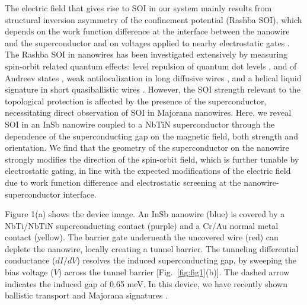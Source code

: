 The electric field that gives rise to SOI in our system mainly results from structural inversion asymmetry of the confinement potential (Rashba SOI), which depends on the work function difference at the interface between the nanowire and the superconductor and on voltages applied to nearby electrostatic gates \cite{Vuik2016,Antipov2018,Woods2018,Mikkelsen2018}.
The Rashba SOI in nanowires has been investigated extensively by measuring spin-orbit related quantum effects: level repulsion of quantum dot levels \cite{Fasth2007,Nadj-Perge2012}, and of Andreev states \cite{Moor2018,Deng2016}, weak antilocalization in long \mbox{diffusive} wires \cite{Hansen2005,Weperen2015}, and a helical liquid signature in short quasiballistic wires \cite{Kammhuber2017}.
However, the SOI strength relevant to the topological protection is affected by the \mbox{presence} of the superconductor, necessitating direct observation of SOI in Majorana nanowires.
Here, we reveal SOI in an InSb nanowire coupled to a NbTiN superconductor through the dependence of the superconducting gap on the magnetic field, both strength and orientation.
We find that the geometry of the superconductor on the nanowire strongly modifies the direction of the spin-orbit field, which is further tunable by electrostatic gating, in line with the expected modifications of the electric field due to work function difference and electrostatic screening at the nanowire-superconductor interface.

Figure 1(a) shows the device image.
An InSb nanowire (blue) is covered by a NbTi/NbTiN superconducting contact (purple) and a Cr/Au normal metal contact (yellow).
The barrier gate underneath the uncovered wire (red) can deplete the nanowire, locally creating a tunnel barrier.
The tunneling differential conductance ($dI/dV$) resolves the induced superconducting gap, by sweeping the bias voltage ($V$) across the tunnel barrier [Fig.~\ref{fig:fig1}(b)].
The dashed arrow indicates the induced gap of 0.65 meV.
In this device, we have recently shown ballistic transport and Majorana signatures \cite{Guel2018}.

